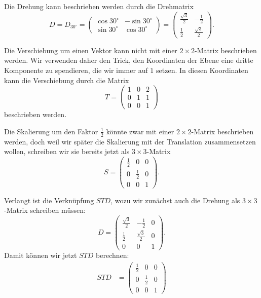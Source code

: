 \begin{loesung}
\begin{teilaufgaben}
\item
Die Drehung kann beschrieben werden durch die Drehmatrix
\[
D=D_{30^\circ}
=
\begin{pmatrix}
\cos 30^\circ & -\sin 30^\circ \\
\sin 30^\circ &  \cos 30^\circ
\end{pmatrix}
=
\begin{pmatrix}
\frac{\sqrt{3}}2 & - \frac12\\
\frac12 & \frac{\sqrt{3}}2
\end{pmatrix}.
\]
\item
Die Verschiebung um einen Vektor kann nicht mit einer $2\times 2$-Matrix
beschrieben werden. Wir verwenden daher den Trick, den Koordinaten der
Ebene eine dritte Komponente zu spendieren, die wir immer auf $1$ setzen.
In diesen Koordinaten kann die Verschiebung durch die Matrix
\[
T=
\begin{pmatrix}
1&0&2\\
0&1&1\\
0&0&1
\end{pmatrix}
\]
beschrieben werden.
\item
Die Skalierung um den Faktor $\frac12$ könnte zwar mit einer $2\times 2$-Matrix
beschrieben werden, doch weil wir später die Skalierung mit der Translation
zusammensetzen wollen, schreiben wir sie bereits jetzt als $3\times 3$-Matrix
\[
S
=
\begin{pmatrix}
\frac12 &     0   & 0 \\
    0   & \frac12 & 0 \\
    0   &     0   & 1 
\end{pmatrix}
.
\]
\item
Verlangt ist die Verknüpfung $STD$, wozu wir zunächst auch die Drehung als
$3\times 3$-Matrix schreiben müssen:
\[
D =
\begin{pmatrix}
\frac{\sqrt{3}}2 & - \frac12        & 0 \\
\frac12          & \frac{\sqrt{3}}2 & 0 \\
      0          &        0         & 1
\end{pmatrix}
.
\]
Damit können wir jetzt $STD$ berechnen:
\begin{align*}
STD
&=
\begin{pmatrix}
\frac12 &     0   & 0 \\
    0   & \frac12 & 0 \\
    0   &     0   & 1 
\end{pmatrix}

\end{align*}
\end{teilaufgaben}
\end{loesung}
